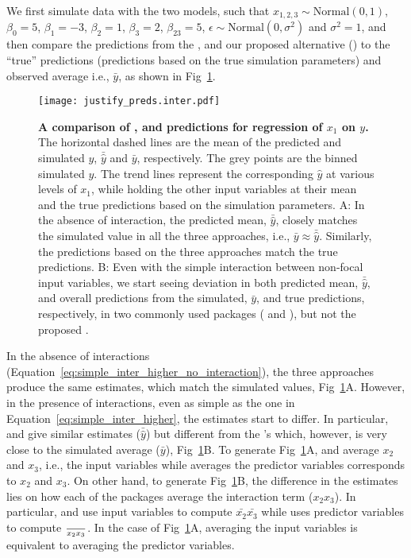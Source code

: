 We first simulate data with the two models, such that $x_{1,2,3} \sim \mathrm{Normal}(0, 1)$, $\beta_0 = 5$, $\beta_1 = -3$, $\beta_2 = 1$, $\beta_3 = 2$, $\beta_{23} = 5$, $\epsilon \sim \mathrm{Normal}(0, \sigma^2)$ and $\sigma^2 = 1$, and then compare the predictions from the ,  and our proposed alternative () to the ``true'' predictions (predictions based on the true simulation parameters) and observed average i.e., $\bar{y}$, as shown in Fig~\ref{fig:justify_plots}.
%
\begin{figure}
\begin{center}
\texttt{[image: justify\_preds.inter.pdf]}
\end{center}
\caption{{\bf A comparison of ,  and  predictions for regression of $x_1$ on $y$.} The horizontal dashed lines are the mean of the predicted and simulated $y$, $\bar{\hat{y}}$ and $\bar{y}$, respectively. The grey points are the binned simulated $y$. The trend lines represent the corresponding $\hat{y}$ at various levels of $x_1$, while holding the other input variables at their mean and the true predictions based on the simulation parameters. A: In the absence of interaction, the predicted mean, $\bar{\hat{y}}$, closely matches the simulated value in all the three approaches, i.e., $\bar{y} \approx \bar{\hat{y}}$. Similarly, the predictions based on the three approaches match the true predictions. B: Even with the simple interaction between non-focal input variables, we start seeing deviation in both predicted mean, $\bar{\hat{y}}$, and overall predictions from the simulated, $\bar{y}$, and true predictions, respectively, in two commonly used packages ( and ), but not the proposed .}
\label{fig:justify_plots}
\end{figure}
%
In the absence of interactions (Equation~\ref{eq:simple_inter_higher_no_interaction}), the three approaches produce the same estimates, which match the simulated values, Fig~\ref{fig:justify_plots}A. However, in the presence of interactions, even as simple as the one in Equation~\ref{eq:simple_inter_higher}, the estimates start to differ. In particular,  and  give similar estimates ($\bar{\hat{y}}$) but different from the 's which, however, is very close to the simulated average ($\bar{y}$), Fig~\ref{fig:justify_plots}B. To generate Fig~\ref{fig:justify_plots}A,   and  average $x_2$ and $x_3$, i.e., the input variables while  averages the predictor variables corresponds to $x_2$ and $x_3$. On other hand, to generate Fig~\ref{fig:justify_plots}B, the difference in the estimates lies on how each of the packages average the interaction term ($x_2x_3$). In particular,  and  use input variables to compute $\bar{x_2}\bar{x_3}$ while  uses predictor variables to compute $\over{x_2x_3}$. In the case of Fig~\ref{fig:justify_plots}A, averaging the input variables is equivalent to averaging the predictor variables.

